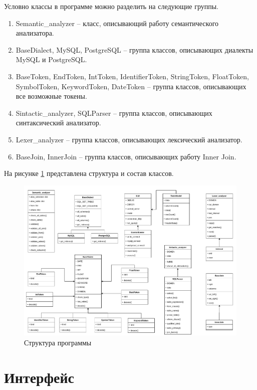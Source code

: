 Условно классы в программе можно разделить на следующие группы.
\begin{enumerate}
	\item Semantic\_analyzer -- класс, описывающий работу семантического анализатора.
	\item BaseDialect, MySQL, PostgreSQL -- группа классов, описывающих диалекты MySQL и PostgreSQL.
	\item BaseToken, EndToken, IntToken, IdentifierToken, StringToken, FloatToken, SymbolToken, KeywordToken,  DateToken -- группа классов, описывающих все возможные токены.
	\item Sintactic\_analyzer, SQLParser -- группа классов, описывающих синтаксический анализатор.
	\item Lexer\_analyzer -- группа классов, описывающих лексический анализатор.
	\item BaseJoin, InnerJoin -- группа классов, описывающих работу Inner Join.
\end{enumerate}

На рисунке \ref{img:uml} представлена структура и состав классов.

\begin{figure}[h!]
	\begin{center}
		\includegraphics[scale=0.5]{./inc/img/uml}
		\caption{Структура программы}
		\label{img:uml}
	\end{center}
\end{figure}
\newpage

\section{Интерфейс}

